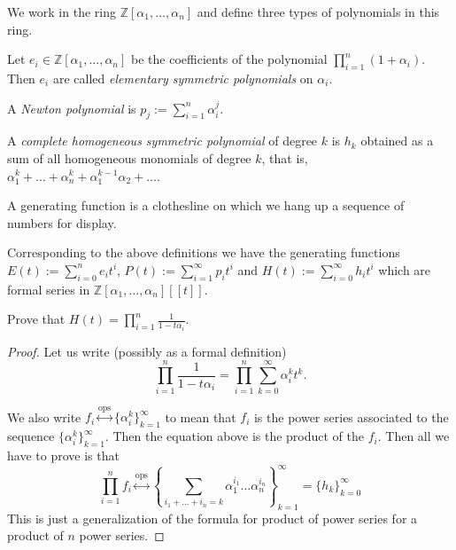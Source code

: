 We work in the ring $\mathbb{Z}[\alpha_1,\ldots,\alpha_n]$ and define three
types of polynomials in this ring.

\begin{definition}
\label{definition-symmetric-polynomial}
Let $e_i \in \mathbb{Z}[\alpha_1,\ldots,\alpha_n]$ be the coefficients of the
polynomial $\prod_{i=1}^n(1+\alpha_i)$. Then $e_i$ are called {\it elementary
symmetric polynomials} on $\alpha_i$.
\end{definition}

\begin{definition}
\label{definition-Newton-polynomial}
A {\it Newton polynomial} is $p_j:=\sum_{i=1}^n\alpha_i^j$.
\end{definition}

\begin{definition}
\label{definition-complete-homogeneous-symmetric-polynomial}
A {\it complete homogeneous symmetric polynomial} of degree $k$ is $h_k$
obtained as a sum of all homogeneous monomials of degree $k$, that is,
$\alpha_1^k+\ldots+\alpha_n^k+\alpha_1^{k-1}\alpha_2+\ldots$.
\end{definition}

\begin{slogan}
\begin{reference}
\cite[p. 1]{generatingfunctionology}
\end{reference}
A generating function is a clothesline on which we hang up a sequence of numbers
for display.
\end{slogan}

Corresponding to the above definitions we have the generating functions 
$E(t):=\sum_{i=0}^ne_it^i$, $P(t):=\sum_{i=1}^\infty p_it^i$ and 
$H(t):=\sum_{i=0}^\infty h_it^i$ which are formal series in 
$\mathbb{Z}[\alpha_1,\ldots,\alpha_n][\![t]\!]$.

\begin{exercise}
\label{exercise-H}
Prove that $H(t)=\prod_{i=1}^n\frac{1}{1-t\alpha_i}$.
\end{exercise}

\begin{proof}
Let us write (possibly as a formal definition)
$$
\prod_{i=1}^n\frac{1}{1-t\alpha_i}=\prod_{i=1}^n\sum_{k=0}^\infty\alpha_i^kt^k.
$$

We also write 
$f_i\overset{\text{ops}}{\longleftrightarrow}\{\alpha_i^k\}_{k=1}^\infty$ to mean
that $f_i$ is the power series associated to the sequence
$\{\alpha_i^k\}_{k=1}^\infty$. Then the equation above is the product of the
$f_i$. Then all we have to prove is that
$$
\prod_{i=1}^nf_i\overset{\text{ops}}{\longleftrightarrow}
\left\{\sum_{i_1+\ldots+i_n=k}\alpha_1^{i_1}\ldots\alpha_n^{i_n}\right\}
_{k=1}^\infty=\{h_k\}_{k=0}^\infty
$$
This is just a generalization of the formula for product of power series for a
product of $n$ power series.
\end{proof}

